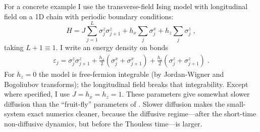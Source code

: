 \documentclass[aps,prb,nofootinbib,twocolumn,balancelastpage,amsmath,amssymb,floatfix,superscriptaddress,]{revtex4-1}
\newcommand{\tr}{\operatorname{Tr}}
\begin{document}
For a concrete example I use the transverse-field Ising model with longitudinal field on a 1D chain with periodic boundary conditions:
\begin{equation}
  \label{eq:tfim}
  H =  J\sum_{j = 1}^{L} \sigma ^z_j \sigma ^z_{j+1} + h_x\sum_j \sigma ^x_j + h_z\sum_j \sigma ^z_j\;,
\end{equation}
taking $L+1 \equiv 1$.
I write an energy density on bonds
\begin{align}
  \varepsilon_j = \sigma ^z_j \sigma ^z_{j+1} + \frac {h_x} 2(\sigma ^x_j  + \sigma^x_{j+1})+ \frac {h_z} 2 (\sigma^z_j + \sigma^z_{j+1})\;.
\end{align}
For $h_z = 0$  the model is free-fermion integrable (by Jordan-Wigner and Bogoliubov transforms);
the longitudinal field breaks that integrability.
Except where specified, I use $J = h_x = h_z = 1$.
These parameters give somewhat slower diffusion than the ``fruit-fly'' parameters of
.
Slower diffusion makes the small-system exact numerics cleaner, because the diffusive regime---after the short-time non-diffusive dynamics, but before the Thouless time---is larger.

\end{document}
